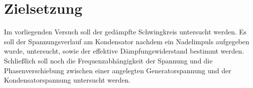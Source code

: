 \section{Zielsetzung}
\label{sec:Zielsetzung}
Im vorliegenden Versuch soll der gedämpfte Schwingkreis untersucht werden.
Es soll der Spannungsverlauf am Kondensator nachdem ein Nadelimpuls aufgegeben wurde, untersucht, sowie der effektive Dämpfungswiderstand bestimmt werden.
Schließlich soll noch die Frequenzabhängigkeit der Spannung und die Phasenverschiebung zwischen einer angelegten Generatorspannung und der Kondensatorspannung untersucht werden.

